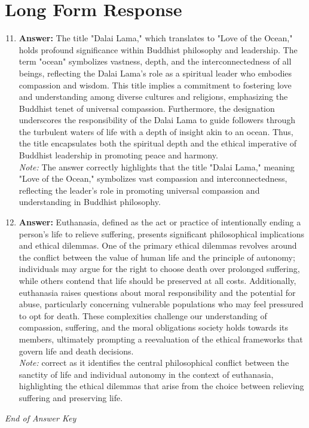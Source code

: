 \documentclass[12pt]{article}
\begin{document}
\section*{Long Form Response}
\begin{enumerate}[label=\arabic*.]
\setcounter{enumi}{10}
\item \textbf{Answer:} The title "Dalai Lama," which translates to "Love of the Ocean," holds profound significance within Buddhist philosophy and leadership. The term "ocean" symbolizes vastness, depth, and the interconnectedness of all beings, reflecting the Dalai Lama's role as a spiritual leader who embodies compassion and wisdom. This title implies a commitment to fostering love and understanding among diverse cultures and religions, emphasizing the Buddhist tenet of universal compassion. Furthermore, the designation underscores the responsibility of the Dalai Lama to guide followers through the turbulent waters of life with a depth of insight akin to an ocean. Thus, the title encapsulates both the spiritual depth and the ethical imperative of Buddhist leadership in promoting peace and harmony.
\\ \textit{Note:} The answer correctly highlights that the title "Dalai Lama," meaning "Love of the Ocean," symbolizes vast compassion and interconnectedness, reflecting the leader's role in promoting universal compassion and understanding in Buddhist philosophy.
\item \textbf{Answer:} Euthanasia, defined as the act or practice of intentionally ending a person's life to relieve suffering, presents significant philosophical implications and ethical dilemmas. One of the primary ethical dilemmas revolves around the conflict between the value of human life and the principle of autonomy; individuals may argue for the right to choose death over prolonged suffering, while others contend that life should be preserved at all costs. Additionally, euthanasia raises questions about moral responsibility and the potential for abuse, particularly concerning vulnerable populations who may feel pressured to opt for death. These complexities challenge our understanding of compassion, suffering, and the moral obligations society holds towards its members, ultimately prompting a reevaluation of the ethical frameworks that govern life and death decisions.
\\ \textit{Note:} correct as it identifies the central philosophical conflict between the sanctity of life and individual autonomy in the context of euthanasia, highlighting the ethical dilemmas that arise from the choice between relieving suffering and preserving life.
\end{enumerate}

\vfill
\noindent\textit{End of Answer Key}
\end{document}
